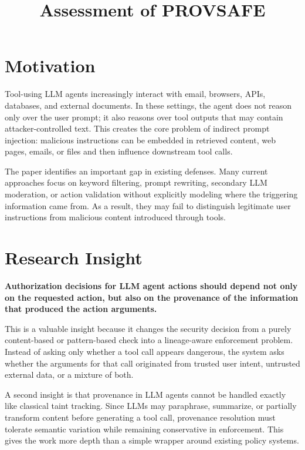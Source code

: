 \documentclass[11pt]{article}
\title{\textbf{Assessment of PROVSAFE}}
\author{}
\date{}
\begin{document}
\maketitle

\section*{Motivation}

Tool-using LLM agents increasingly interact with email, browsers, APIs, databases, and external documents. In these settings, the agent does not reason only over the user prompt; it also reasons over tool outputs that may contain attacker-controlled text. This creates the core problem of indirect prompt injection: malicious instructions can be embedded in retrieved content, web pages, emails, or files and then influence downstream tool calls.

The paper identifies an important gap in existing defenses. Many current approaches focus on keyword filtering, prompt rewriting, secondary LLM moderation, or action validation without explicitly modeling where the triggering information came from. As a result, they may fail to distinguish legitimate user instructions from malicious content introduced through tools.

\section*{Research Insight}

 \textbf{Authorization decisions for LLM agent actions should depend not only on the requested action, but also on the provenance of the information that produced the action arguments.}

This is a valuable insight because it changes the security decision from a purely content-based or pattern-based check into a lineage-aware enforcement problem. Instead of asking only whether a tool call appears dangerous, the system asks whether the arguments for that call originated from trusted user intent, untrusted external data, or a mixture of both.

A second insight is that provenance in LLM agents cannot be handled exactly like classical taint tracking. Since LLMs may paraphrase, summarize, or partially transform content before generating a tool call, provenance resolution must tolerate semantic variation while remaining conservative in enforcement. This gives the work more depth than a simple wrapper around existing policy systems.
\end{document}
